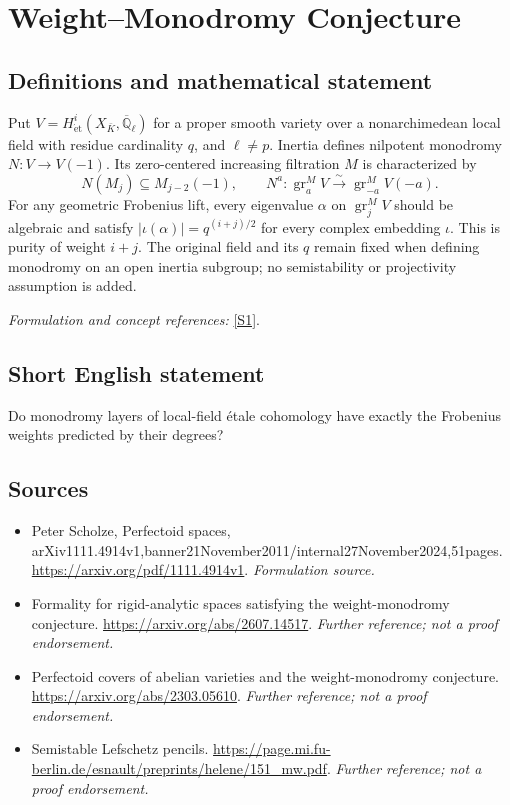 \documentclass[11pt]{article}
\begin{document}
\section*{\texorpdfstring{Weight–Monodromy Conjecture}{Weight–Monodromy Conjecture}}\label{30006718}
\subsection{Definitions and mathematical statement}
Put $V=H^i_{\mathrm{\acute et}}(X_{\bar K},\overline{\mathbb{Q}}_\ell)$ for a proper smooth variety over a nonarchimedean local field with residue cardinality $q$, and $\ell\ne p$. Inertia defines nilpotent monodromy $N:V\to V(-1)$. Its zero-centered increasing filtration $M$ is characterized by
\[
 N(M_j)\subseteq M_{j-2}(-1),\qquad
 N^a:\operatorname{gr}^M_aV\xrightarrow{\sim}\operatorname{gr}^M_{-a}V(-a).
\]
For any geometric Frobenius lift, every eigenvalue $\alpha$ on $\operatorname{gr}^M_jV$ should be algebraic and satisfy $|\iota(\alpha)|=q^{(i+j)/2}$ for every complex embedding $\iota$. This is purity of weight $i+j$. The original field and its $q$ remain fixed when defining monodromy on an open inertia subgroup; no semistability or projectivity assumption is added.
\par\smallskip\textit{Formulation and concept references:} \href{https://arxiv.org/pdf/1111.4914v1}{[S1]}.

\subsection{Short English statement}
Do monodromy layers of local-field étale cohomology have exactly the Frobenius weights predicted by their degrees?
\subsection{Sources}
\begin{itemize}
\item[S1]Peter Scholze, Perfectoid spaces, arXiv1111.4914v1,banner21November2011/internal27November2024,51pages.
\url{https://arxiv.org/pdf/1111.4914v1}.
\textit{Formulation source.}
\item[S2]Formality for rigid-analytic spaces satisfying the weight-monodromy conjecture.
\url{https://arxiv.org/abs/2607.14517}.
\textit{Further reference; not a proof endorsement.}
\item[S3]Perfectoid covers of abelian varieties and the weight-monodromy conjecture.
\url{https://arxiv.org/abs/2303.05610}.
\textit{Further reference; not a proof endorsement.}
\item[S4]Semistable Lefschetz pencils.
\url{https://page.mi.fu-berlin.de/esnault/preprints/helene/151_mw.pdf}.
\textit{Further reference; not a proof endorsement.}
\end{itemize}
\end{document}
